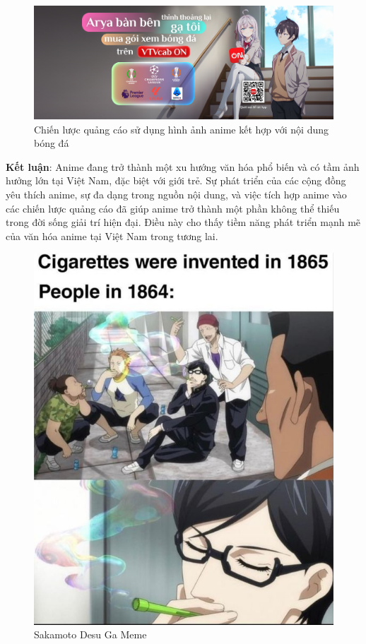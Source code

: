 \begin{itemize}
\begin{figure}[H]
    \centerline{\includegraphics[width=0.8\linewidth, height=\linewidth]{content/background/image/vtvCab.png}}
    \caption{Chiến lược quảng cáo sử dụng hình ảnh anime kết hợp với nội dung bóng đá}
    \label{fig}
    \end{figure}
\end{itemize}

\headindent \textbf{Kết luận}: Anime đang trở thành một xu hướng văn hóa phổ biến và có tầm ảnh hưởng lớn tại Việt Nam, đặc biệt với giới trẻ. Sự phát triển của các cộng đồng yêu thích anime, sự đa dạng trong nguồn nội dung, và việc tích hợp anime vào các chiến lược quảng cáo đã giúp anime trở thành một phần không thể thiếu trong đời sống giải trí hiện đại. Điều này cho thấy tiềm năng phát triển mạnh mẽ của văn hóa anime tại Việt Nam trong tương lai.

\vspace{0.5cm}
\begin{figure}[H]
\centerline{\includegraphics[width=\linewidth, height=0.6\linewidth]{content/background/image/cigarettes.jpg}}
\caption{Sakamoto Desu Ga Meme}
\label{fig}
\end{figure}
    
\pagebreak


